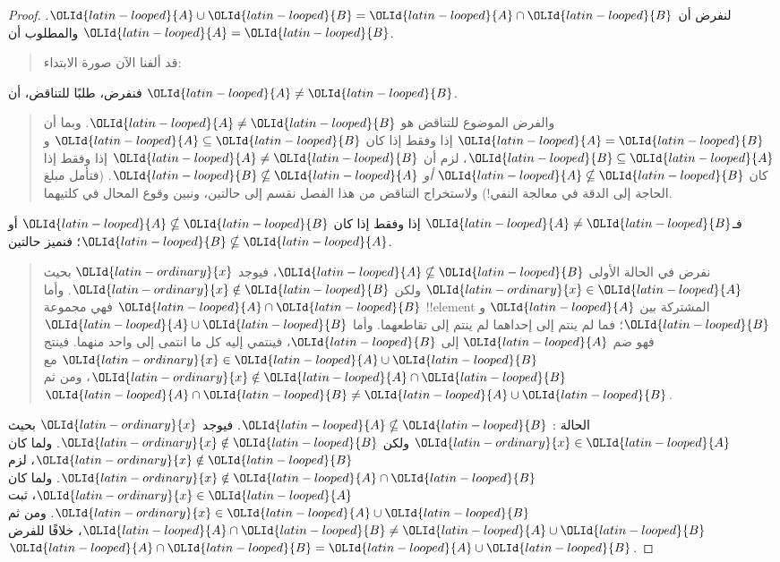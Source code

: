 \documentclass[../../../include/open-logic-section]{subfiles}
\begin{document}
\begin{proof}
  لنفرض أن $\OLId{latin-looped}{A} \cup \OLId{latin-looped}{B} = \OLId{latin-looped}{A} \cap \OLId{latin-looped}{B}$. والمطلوب أن $\OLId{latin-looped}{A} = \OLId{latin-looped}{B}$.
  \begin{quote}
    قد ألفنا الآن صورة الابتداء:
  \end{quote}
  فنفرض، طلبًا للتناقض، أن $\OLId{latin-looped}{A} \neq \OLId{latin-looped}{B}$.
  \begin{quote}
    والفرض الموضوع للتناقض هو $\OLId{latin-looped}{A} \neq \OLId{latin-looped}{B}$. وبما أن $\OLId{latin-looped}{A} = \OLId{latin-looped}{B}$ إذا وفقط
    إذا كان $\OLId{latin-looped}{A} \subseteq \OLId{latin-looped}{B}$ و$\OLId{latin-looped}{B} \subseteq \OLId{latin-looped}{A}$، لزم أن
    $\OLId{latin-looped}{A} \neq \OLId{latin-looped}{B}$ إذا وفقط إذا كان $\OLId{latin-looped}{A} \nsubseteq \OLId{latin-looped}{B}$ \emph{أو}
    $\OLId{latin-looped}{B} \nsubseteq \OLId{latin-looped}{A}$. (فتأمل مبلغ الحاجة إلى الدقة في معالجة
    النفي!{}) ولاستخراج التناقض من هذا الفصل نقسم إلى حالتين، ونبين
    وقوع المحال في كلتيهما.
  \end{quote}
  فـ$\OLId{latin-looped}{A} \neq \OLId{latin-looped}{B}$ إذا وفقط إذا كان $\OLId{latin-looped}{A} \nsubseteq \OLId{latin-looped}{B}$ أو
  $\OLId{latin-looped}{B} \nsubseteq \OLId{latin-looped}{A}$؛ فنميز حالتين.
  \begin{quote}
    نفرض في الحالة الأولى $\OLId{latin-looped}{A} \nsubseteq \OLId{latin-looped}{B}$، فيوجد $\OLId{latin-ordinary}{x}$ بحيث
    $\OLId{latin-ordinary}{x} \in \OLId{latin-looped}{A}$ ولكن $\OLId{latin-ordinary}{x} \notin \OLId{latin-looped}{B}$. وأما $\OLId{latin-looped}{A} \cap \OLId{latin-looped}{B}$ فهي مجموعة
    !!{element} المشتركة بين $\OLId{latin-looped}{A}$ و$\OLId{latin-looped}{B}$؛ فما لم ينتم إلى إحداهما لم
    ينتم إلى تقاطعهما. وأما $\OLId{latin-looped}{A} \cup \OLId{latin-looped}{B}$ فهو ضم $\OLId{latin-looped}{A}$ إلى $\OLId{latin-looped}{B}$، فينتمي
    إليه كل ما انتمى إلى واحد منهما. فينتج
    $\OLId{latin-ordinary}{x} \in \OLId{latin-looped}{A} \cup \OLId{latin-looped}{B}$ مع $\OLId{latin-ordinary}{x} \notin \OLId{latin-looped}{A} \cap \OLId{latin-looped}{B}$، ومن ثم
    $\OLId{latin-looped}{A} \cap \OLId{latin-looped}{B} \neq \OLId{latin-looped}{A} \cup \OLId{latin-looped}{B}$.
  \end{quote}

  الحالة : $\OLId{latin-looped}{A} \nsubseteq \OLId{latin-looped}{B}$. فيوجد $\OLId{latin-ordinary}{x}$ بحيث $\OLId{latin-ordinary}{x} \in \OLId{latin-looped}{A}$ ولكن
  $\OLId{latin-ordinary}{x} \notin \OLId{latin-looped}{B}$. ولما كان $\OLId{latin-ordinary}{x} \notin \OLId{latin-looped}{B}$، لزم $\OLId{latin-ordinary}{x} \notin \OLId{latin-looped}{A} \cap \OLId{latin-looped}{B}$.
  ولما كان $\OLId{latin-ordinary}{x} \in \OLId{latin-looped}{A}$، ثبت $\OLId{latin-ordinary}{x} \in \OLId{latin-looped}{A} \cup \OLId{latin-looped}{B}$. ومن ثم
  $\OLId{latin-looped}{A} \cap \OLId{latin-looped}{B} \neq \OLId{latin-looped}{A} \cup \OLId{latin-looped}{B}$، خلافًا للفرض
  $\OLId{latin-looped}{A} \cap \OLId{latin-looped}{B} = \OLId{latin-looped}{A} \cup \OLId{latin-looped}{B}$.


\end{proof}
\end{document}
